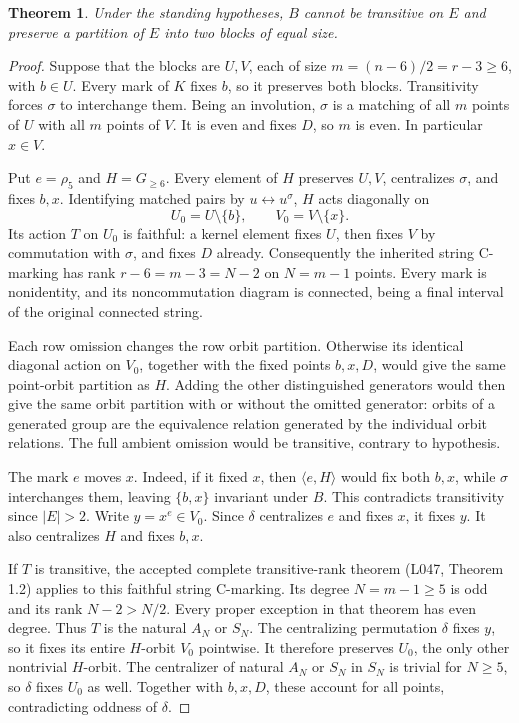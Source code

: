 \documentclass[11pt,a4paper]{article}
\newtheorem{theorem}[lemma]{Theorem}
\newcommand{\gen}[1]{\langle#1\rangle}
\begin{document}
\begin{theorem}
Under the standing hypotheses, $B$ cannot be transitive on $E$
and preserve a partition of $E$ into two blocks of equal size.
\end{theorem}
\begin{proof}
Suppose that the blocks are $U,V$, each of size
$m=(n-6)/2=r-3\ge6$, with $b\in U$. Every mark of $K$
fixes $b$, so it preserves both blocks. Transitivity forces
$\sigma$ to interchange them. Being an involution, $\sigma$
is a matching of all $m$ points of $U$ with all $m$ points
of $V$. It is even and fixes $D$, so $m$ is even.
In particular $x\in V$.

Put $e=\rho_5$ and $H=G_{\ge6}$. Every element of $H$
preserves $U,V$, centralizes $\sigma$, and fixes $b,x$.
Identifying matched pairs by $u\leftrightarrow u^\sigma$,
$H$ acts diagonally on
\[
 U_0=U\setminus\{b\},\qquad V_0=V\setminus\{x\}.
\]
Its action $T$ on $U_0$ is faithful: a kernel element fixes
$U$, then fixes $V$ by commutation with $\sigma$, and fixes
$D$ already. Consequently the inherited string C-marking has
rank $r-6=m-3=N-2$ on $N=m-1$ points. Every mark is
nonidentity, and its noncommutation diagram is connected,
being a final interval of the original connected string.

Each row omission changes the row orbit partition. Otherwise
its identical diagonal action on $V_0$, together with the fixed
points $b,x,D$, would give the same point-orbit partition as
$H$. Adding the other distinguished generators would then give
the same orbit partition with or without the omitted generator:
orbits of a generated group are the equivalence relation generated
by the individual orbit relations. The full ambient omission
would be transitive, contrary to hypothesis.

The mark $e$ moves $x$. Indeed, if it fixed $x$, then
$\gen{e,H}$ would fix both $b,x$, while $\sigma$ interchanges
them, leaving $\{b,x\}$ invariant under $B$. This contradicts
transitivity since $|E|>2$. Write $y=x^e\in V_0$.
Since $\delta$ centralizes $e$ and fixes $x$, it fixes $y$.
It also centralizes $H$ and fixes $b,x$.

If $T$ is transitive, the accepted complete transitive-rank
theorem (L047, Theorem 1.2) applies to this faithful string
C-marking. Its degree $N=m-1\ge5$ is odd and its rank
$N-2>N/2$. Every proper exception in that theorem has even
degree. Thus $T$ is the natural $A_N$ or $S_N$.
The centralizing permutation $\delta$ fixes $y$, so it fixes
its entire $H$-orbit $V_0$ pointwise. It therefore preserves
$U_0$, the only other nontrivial $H$-orbit. The centralizer
of natural $A_N$ or $S_N$ in $S_N$ is trivial for $N\ge5$,
so $\delta$ fixes $U_0$ as well. Together with $b,x,D$,
these account for all points, contradicting oddness of $\delta$.


\end{proof}
\end{document}
